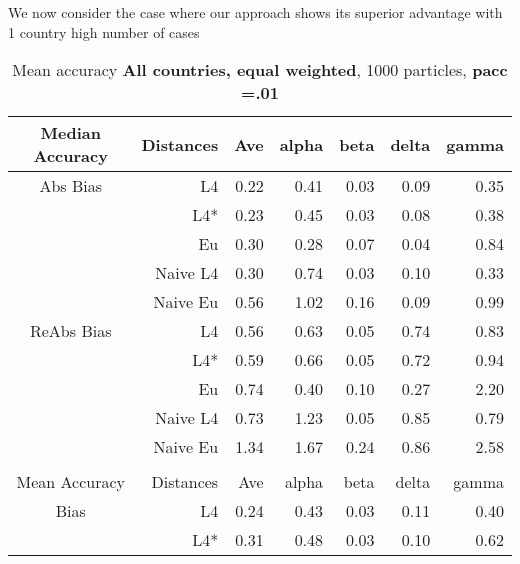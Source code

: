 \documentclass[a4paper,12pt,twoside]{book}
\begin{document}
We now consider the case where our approach shows its superior advantage with 1 country high number of cases

\begin{table}[H]

\centering
\vfill
\vspace{2cm}
\caption{Mean  accuracy \textbf{All countries, equal weighted}, 1000 particles, \textbf{pacc =.01}}


\begin{tabular}{crrrrrr}

  \hline
  
{\color{blue}Median Accuracy} & Distances & Ave & alpha & beta & delta & gamma \\ 
  \hline
{\color{blue}Abs Bias} & L4  &0.22 & 0.41 & 0.03 & 0.09 & 0.35 \\ 
  
 
&L4*  & 0.23 & 0.45 & 0.03 & 0.08 & 0.38 \\ 
  
  
&Eu &   0.30 & 0.28 & 0.07 & 0.04 & 0.84 \\ 
  
 
&Naive L4&     0.30 & 0.74 & 0.03 & 0.10 & 0.33 \\ 
  
  
&Naive Eu &   0.56 & 1.02 & 0.16 & 0.09 & 0.99 \\ 
  
   \hline
   
{\color{blue} ReAbs Bias } & L4  &0.56 & 0.63 & 0.05 & 0.74 & 0.83 \\ 
  
&L4*  & 
  0.59 & 0.66 & 0.05 & 0.72 & 0.94 \\ 
 
  
&Eu &   
    0.74 & 0.40 & 0.10 & 0.27 & 2.20 \\ 
 
&Naive L4& 0.73 & 1.23 & 0.05 & 0.85 & 0.79 \\ 
&Naive Eu &     
   1.34 & 1.67 & 0.24 & 0.86 & 2.58 \\ 
  
  \\
   \hline
{\color{blue}Mean Accuracy} & Distances & Ave & alpha & beta & delta & gamma \\ 
  \hline
{\color{blue}Bias} & L4  &0.24 & 0.43 & 0.03 & 0.11 & 0.40 \\ 
  
&L4*  &0.31 & 0.48 & 0.03 & 0.10 & 0.62 \\ 
  

\end{tabular}
\end{table}
\end{document}
